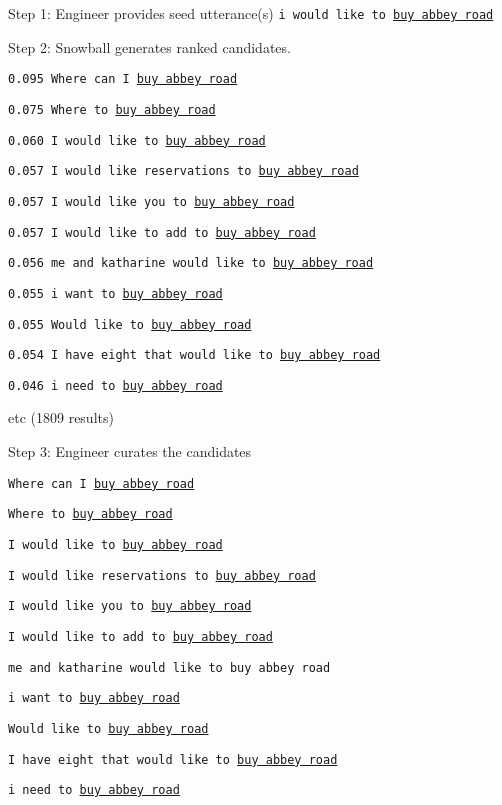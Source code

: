 \documentclass[12pt]{beamer}
\begin{document}
\begin{frame}{Step 1: Engineer provides seed utterance(s)}
\texttt{i would like to \underline{buy abbey road}}
\end{frame}
  
\begin{frame}{Step 2: Snowball generates ranked candidates.}

{\small \texttt{0.095 Where can I \underline{buy abbey road}}

\texttt{0.075 Where to \underline{buy abbey road}}

\texttt{0.060 I would like to \underline{buy abbey road}}

\texttt{0.057 I would like reservations to \underline{buy abbey road}}

\texttt{0.057 I would like you to \underline{buy abbey road}}

\texttt{0.057 I would like to add to \underline{buy abbey road}}

\texttt{0.056 me and katharine would like to \underline{buy abbey road}}

\texttt{0.055 i want to \underline{buy abbey road}}

\texttt{0.055 Would like to \underline{buy abbey road}}

\texttt{0.054 I have eight that would like to \underline{buy abbey road}}

\texttt{0.046 i need to \underline{buy abbey road}}

\bigskip 
etc (1809 results)}

\end{frame}

\begin{frame}{Step 3: Engineer curates the candidates}

  \texttt{Where can I \underline{buy abbey road}}

  \texttt{Where to \underline{buy abbey road}}

  \texttt{I would like to \underline{buy abbey road}}

  \texttt{I would like reservations to \underline{buy abbey road}}

  \texttt{I would like you to \underline{buy abbey road}}

  \texttt{I would like to add to \underline{buy abbey road}}

  \texttt{me and katharine would like to buy abbey road}

  \texttt{i want to \underline{buy abbey road}}

  \texttt{Would like to \underline{buy abbey road}}

  \texttt{I have eight that would like to \underline{buy abbey road}}

  \texttt{i need to \underline{buy abbey road}}

\end{frame}
\end{document}

